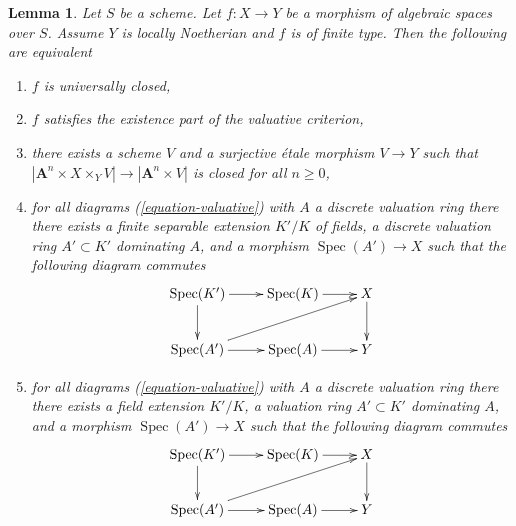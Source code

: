 \documentclass{stacks-project}
\theoremstyle{plain}
\newtheorem{lemma}[subsection]{Lemma}
\theoremstyle{definition}
\theoremstyle{remark}
\numberwithin{equation}{subsection}
\def\Spec{\mathop{\mathrm{Spec}}}
\begin{document}
\begin{lemma}
\label{lemma-check-universally-closed-Noetherian}
Let $S$ be a scheme. Let $f : X \to Y$ be a morphism of algebraic
spaces over $S$. Assume $Y$ is locally Noetherian and $f$ is
of finite type. Then the following are equivalent
\begin{enumerate}
\item $f$ is universally closed,
\item $f$ satisfies the existence part of the valuative criterion,
\item there exists a scheme $V$ and a surjective \'etale morphism
$V \to Y$ such that
$|\mathbf{A}^n \times X \times_Y V| \to |\mathbf{A}^n \times V|$ is closed
for all $n \geq 0$,
\item for all diagrams (\ref{equation-valuative}) with $A$ a discrete
valuation ring there there exists a finite separable extension $K'/K$
of fields, a discrete valuation ring $A' \subset K'$ dominating $A$, and
a morphism $\Spec(A') \to X$ such that the following diagram commutes
$$
\xymatrix{
\Spec(K') \ar[r] \ar[d] & \Spec(K) \ar[r] & X \ar[d] \\
\Spec(A') \ar[r] \ar[rru] & \Spec(A) \ar[r] & Y
}
$$
\item for all diagrams (\ref{equation-valuative}) with $A$ a discrete
valuation ring there there exists a field extension $K'/K$,
a valuation ring $A' \subset K'$ dominating $A$, and
a morphism $\Spec(A') \to X$ such that the following diagram commutes
$$
\xymatrix{
\Spec(K') \ar[r] \ar[d] & \Spec(K) \ar[r] & X \ar[d] \\
\Spec(A') \ar[r] \ar[rru] & \Spec(A) \ar[r] & Y
}
$$
\end{enumerate}
\end{lemma}
\end{document}
